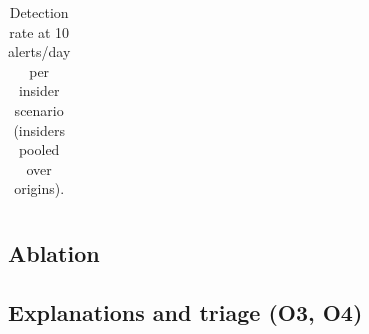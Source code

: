 \begin{table}[t]
\centering
\caption{Detection rate at 10 alerts/day per insider scenario (insiders pooled over origins).}
\label{tab:scenario}
\begin{tabular}{lccc}
\toprule

\bottomrule
\end{tabular}
\end{table}

\subsection{Ablation}


\subsection{Explanations and triage (O3, O4)}


